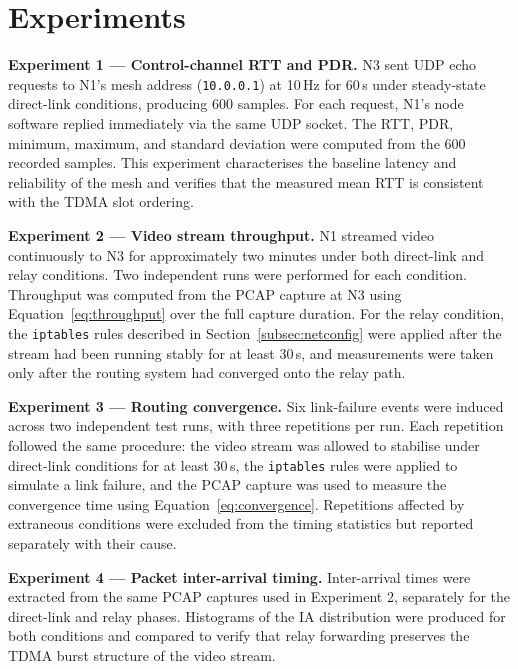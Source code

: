 \section{Experiments}
\label{sec:experiments}

\textbf{Experiment 1 --- Control-channel RTT and PDR.}
N3 sent UDP echo requests to N1's mesh address (\texttt{10.0.0.1}) at
10\,Hz for 60\,s under steady-state direct-link conditions, producing 600
samples. For each request, N1's node software replied immediately via the
same UDP socket. The RTT, PDR, minimum, maximum, and standard deviation
were computed from the 600 recorded samples. This experiment characterises
the baseline latency and reliability of the mesh and verifies that the
measured mean RTT is consistent with the TDMA slot ordering.

\textbf{Experiment 2 --- Video stream throughput.}
N1 streamed video continuously to N3 for approximately two minutes under
both direct-link and relay conditions. Two independent runs were performed
for each condition. Throughput was computed from the PCAP capture at N3
using Equation~\ref{eq:throughput} over the full capture duration. For
the relay condition, the \texttt{iptables} rules described in
Section~\ref{subsec:netconfig} were applied after the stream had been
running stably for at least 30\,s, and measurements were taken only after
the routing system had converged onto the relay path.

\textbf{Experiment 3 --- Routing convergence.}
Six link-failure events were induced across two independent test runs,
with three repetitions per run. Each repetition followed the same
procedure: the video stream was allowed to stabilise under direct-link
conditions for at least 30\,s, the \texttt{iptables} rules were applied
to simulate a link failure, and the PCAP capture was used to measure the
convergence time using Equation~\ref{eq:convergence}. Repetitions affected
by extraneous conditions were excluded from the timing statistics but
reported separately with their cause.

\textbf{Experiment 4 --- Packet inter-arrival timing.}
Inter-arrival times were extracted from the same PCAP captures used in
Experiment 2, separately for the direct-link and relay phases.
Histograms of the IA distribution were produced for both conditions and
compared to verify that relay forwarding preserves the TDMA burst
structure of the video stream.



